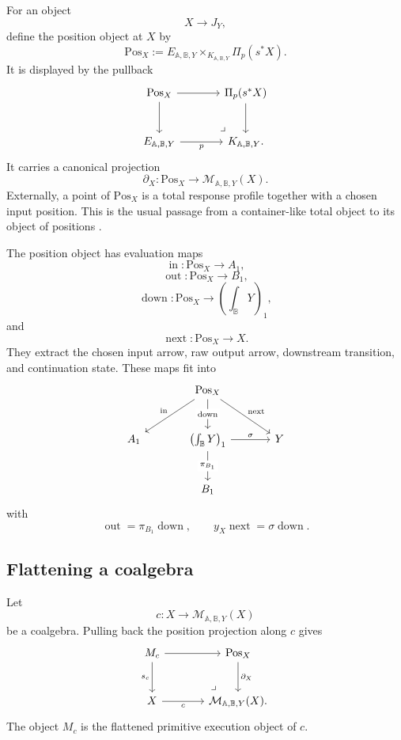 For an object
\[
X\to J_Y,
\]
define the position object at \(X\) by
\[
\mathrm{Pos}_X
:=
E_{\mathbb A,\mathbb B,Y}
\times_{K_{\mathbb A,\mathbb B,Y}}
\Pi_p(s^\ast X).
\]
It is displayed by the pullback
\[
\begin{tikzcd}[column sep=large,row sep=large]
\mathrm{Pos}_X
  \arrow[r]
  \arrow[d]
&
\Pi_p(s^\ast X)
  \arrow[d]
\\
E_{\mathbb A,\mathbb B,Y}
  \arrow[r,"p"']
&
K_{\mathbb A,\mathbb B,Y}
\arrow[ul,phantom,very near start,"\lrcorner"] .
\end{tikzcd}
\]
It carries a canonical projection
\[
\partial_X:\mathrm{Pos}_X\to
\mathcal M_{\mathbb A,\mathbb B,Y}(X).
\]
Externally, a point of \(\mathrm{Pos}_X\) is a total response profile together
with a chosen input position.  This is the usual passage from a container-like
total object to its object of positions
\cite{AbbottAltenkirchGhani2005Containers}.

The position object has evaluation maps
\[
\operatorname{in}:\mathrm{Pos}_X\to A_1,
\]
\[
\operatorname{out}:\mathrm{Pos}_X\to B_1,
\]
\[
\operatorname{down}:\mathrm{Pos}_X\to
\left(\int_{\mathbb B}Y\right)_1,
\]
and
\[
\operatorname{next}:\mathrm{Pos}_X\to X.
\]
They extract the chosen input arrow, raw output arrow, downstream transition,
and continuation state.  These maps fit into
\[
\begin{tikzcd}[column sep=large,row sep=large]
&
\mathrm{Pos}_X
  \arrow[dl,"\operatorname{in}"']
  \arrow[d,"\operatorname{down}" description]
  \arrow[dr,"\operatorname{next}"]
&
\\
A_1
&
\left(\int_{\mathbb B}Y\right)_1
  \arrow[d,"\pi_{B_1}" description]
  \arrow[r,"\sigma"]
&
Y
\\
&
B_1
&
\end{tikzcd}
\]
with
\[
\operatorname{out}
=
\pi_{B_1}\operatorname{down},
\qquad
y_X\operatorname{next}
=
\sigma\operatorname{down}.
\]

\subsection{Flattening a coalgebra}
\label{subsec:poly-relative-flattening-coalgebra}

Let
\[
c:X\to\mathcal M_{\mathbb A,\mathbb B,Y}(X)
\]
be a coalgebra.  Pulling back the position projection along \(c\) gives
\[
\begin{tikzcd}[column sep=large,row sep=large]
M_c
  \arrow[r]
  \arrow[d,"s_c"']
&
\mathrm{Pos}_X
  \arrow[d,"\partial_X"]
\\
X
  \arrow[r,"c"']
&
\mathcal M_{\mathbb A,\mathbb B,Y}(X)
\arrow[ul,phantom,very near start,"\lrcorner"] .
\end{tikzcd}
\]
The object \(M_c\) is the flattened primitive execution object of \(c\).

